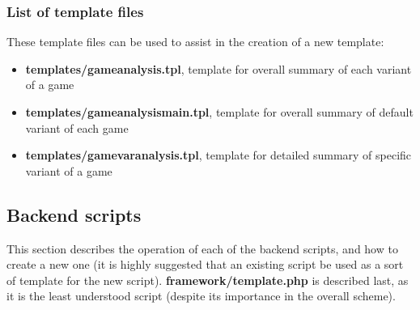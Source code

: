 \documentclass[11pt]{article}
\begin{document}
\subsubsection{List of template files}
These template files can be used to assist in the creation of a new template:
\begin{itemize}
\item \textbf{templates/gameanalysis.tpl}, template for overall summary of each variant of a game
\item \textbf{templates/gameanalysismain.tpl}, template for overall summary of default variant of each game
\item \textbf{templates/gamevaranalysis.tpl}, template for detailed summary of specific variant of a game
\end{itemize}
\subsection{Backend scripts}
This section describes the operation of each of the backend scripts, and how to create a new one (it is highly suggested that an existing script be used as a sort of template for the new script). \textbf{framework/template.php} is described last, as it is the least understood script (despite its importance in the overall scheme).
\end{document}
